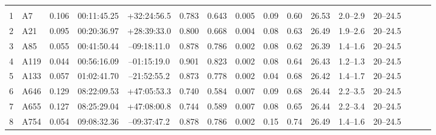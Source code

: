 \documentclass[useAMS,usenatbib]{mnras}
\begin{document}
\begin{table}
\begin{tabular*}{1.0\textwidth}{ l l c c c r c c c c c c c c l l }
 \hline
 \\
1 & A7 & 0.106 & 00:11:45.25 & +32:24:56.5 & 0.783 & 0.643 & 0.005 \hspace{8pt}& 0.09 & 0.60 & 26.53 \hspace{8pt}& 2.0--2.9 \hspace{8pt}& 20--24.5 \\
2 & A21 & 0.095 & 00:20:36.97 & +28:39:33.0 & 0.800 & 0.668 & 0.004 \hspace{8pt}& 0.08 & 0.63 & 26.49 \hspace{8pt}& 1.9--2.6 \hspace{8pt}& 20--24.5 \\
3 & A85 & 0.055 & 00:41:50.44 & \hspace{1.5pt}--\hspace{0.5pt}09:18:11.0 & 0.878 & 0.786 & 0.002 \hspace{8pt}& 0.08 & 0.62 & 26.39 \hspace{8pt}& 1.4--1.6 \hspace{8pt}& 20--24.5 \\
4 & A119 & 0.044 & 00:56:16.09 & \hspace{1.5pt}--\hspace{0.5pt}01:15:19.0 & 0.901 & 0.823 & 0.002 \hspace{8pt}& 0.08 & 0.64 & 26.43 \hspace{8pt}& 1.2--1.3 \hspace{8pt}& 20--24.5 \\
5 & A133 & 0.057 & 01:02:41.70 & \hspace{1.5pt}--\hspace{0.5pt}21:52:55.2 & 0.873 & 0.778 & 0.002 \hspace{8pt}& 0.04 & 0.68 & 26.42 \hspace{8pt}& 1.4--1.7 \hspace{8pt}& 20--24.5 \\
6 & A646 & 0.129 & 08:22:09.53 & +47:05:53.3 & 0.740 & 0.584 & 0.007 \hspace{8pt}& 0.09 & 0.68 & 26.44 \hspace{8pt}& 2.2--3.5 \hspace{8pt}& 20--24.5 \\
7 & A655 & 0.127 & 08:25:29.04 & +47:08:00.8 & 0.744 & 0.589 & 0.007 \hspace{8pt}& 0.08 & 0.65 & 26.44 \hspace{8pt}& 2.2--3.4 \hspace{8pt}& 20--24.5 \\
8 & A754 & 0.054 & 09:08:32.36 & \hspace{1.5pt}--\hspace{0.5pt}09:37:47.2 & 0.878 & 0.786 & 0.002 \hspace{8pt}& 0.15 & 0.74 & 26.49 \hspace{8pt}& 1.4--1.6 \hspace{8pt}& 20--24.5 \\

\end{tabular*}
\end{table}
\end{document}
